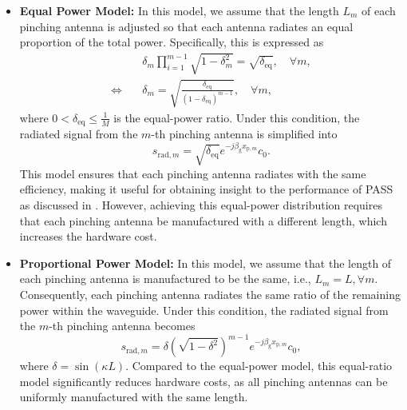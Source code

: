 \begin{itemize}
    \item \textbf{Equal Power Model:} In this model, we assume that the length $L_m$ of each pinching antenna is adjusted so that each antenna radiates an equal proportion of the total power. Specifically, this is expressed as
    \begin{align}
        &\delta_m \prod_{i=1}^{m-1} \sqrt{1 - \delta_m^2} = \sqrt{\delta_{\mathrm{eq}}}, \quad \forall m, \nonumber \\
        \Leftrightarrow \quad & \delta_m = \sqrt{\frac{\delta_{\mathrm{eq}}}{(1 - \delta_{\mathrm{eq}})^{m-1}}}, \quad \forall m,
    \end{align}
    where $0 < \delta_{\mathrm{eq}} \le \frac{1}{M}$ is the equal-power ratio. Under this condition, the radiated signal from the $m$-th pinching antenna is simplified into
    \begin{equation}
        s_{\mathrm{rad},m} = \sqrt{\delta_{\mathrm{eq}}}  e^{-j \beta_{\mathrm{g}} x_{\mathrm{p},m}} c_0.
    \end{equation} 
    This model ensures that each pinching antenna radiates with the same efficiency, making it useful for obtaining insight to the performance of PASS as discussed in \cite{ding2024flexible}. However, achieving this equal-power distribution requires that each pinching antenna be manufactured with a different length, which increases the hardware cost.
    \item \textbf{Proportional Power Model:} In this model, we assume that the length of each pinching antenna is manufactured to be the same, i.e., $L_m = L, \forall m$. Consequently, each pinching antenna radiates the same ratio of the remaining power within the waveguide. Under this condition, the radiated signal from the $m$-th pinching antenna becomes
    \begin{equation}
        s_{\mathrm{rad},m} = \delta \left(\sqrt{1 - \delta^2}\right)^{m-1} e^{-j \beta_{\mathrm{g}} x_{\mathrm{p},m}} c_0,
    \end{equation}
    where $\delta = \sin(\kappa L)$. Compared to the equal-power model, this equal-ratio model significantly reduces hardware costs, as all pinching antennas can be uniformly manufactured with the same length.
\end{itemize}

